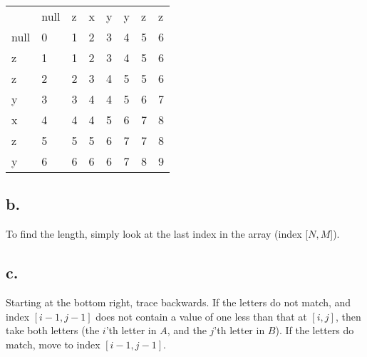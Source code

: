 \documentclass[letterpaper,notitlepage,twoside]{article}
\begin{document}
\begin{tabular}{llllllll}
     & null & z & x & y & y & z & z \\
null & 0    & 1 & 2 & 3 & 4 & 5 & 6 \\
z    & 1    & 1 & 2 & 3 & 4 & 5 & 6 \\
z    & 2    & 2 & 3 & 4 & 5 & 5 & 6 \\
y    & 3    & 3 & 4 & 4 & 5 & 6 & 7 \\
x    & 4    & 4 & 4 & 5 & 6 & 7 & 8 \\
z    & 5    & 5 & 5 & 6 & 7 & 7 & 8 \\
y    & 6    & 6 & 6 & 6 & 7 & 8 & 9 \\
\end{tabular}

\subsection*{b.}
To find the length, simply look at the last index in the array (index [$N,M$]).  
\subsection*{c.}
Starting at the bottom right, trace backwards. If the letters do not match, and index $[i-1, j-1]$ does not contain a value of one less than that at $[i, j]$, then take both letters (the $i$'th letter in $A$, and the $j$'th letter in $B$). If the letters do match, move to index $[i-1, j-1]$. 
\end{document}
